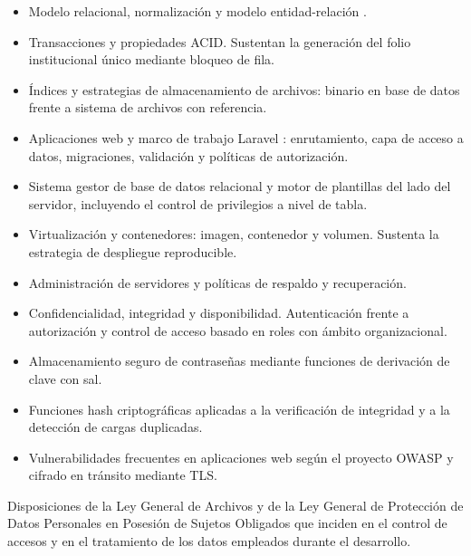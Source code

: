 \begin{description}[leftmargin=0pt,font=\bfseries,itemsep=0.6em,parsep=0pt]
  \item[Bases de datos y modelado.]\leavevmode
  \begin{itemize}[nosep,leftmargin=1.4em,topsep=1pt]
    \item Modelo relacional, normalización y modelo entidad-re\-la\-ción \cite{elmasri2016}.
    \item Transacciones y propiedades ACID. Sustentan la generación del folio institucional único mediante bloqueo de fila.
    \item Índices y estrategias de almacenamiento de archivos: binario en base de datos frente a sistema de archivos con referencia.
  \end{itemize}

  \item[Tecnologías de desarrollo e infraestructura.]\leavevmode
  \begin{itemize}[nosep,leftmargin=1.4em,topsep=1pt]
    \item Aplicaciones web y marco de trabajo Laravel \cite{laraveldocs}: enrutamiento, capa de acceso a datos, migraciones, validación y políticas de autorización.
    \item Sistema gestor de base de datos relacional y motor de plantillas del lado del servidor, incluyendo el control de privilegios a nivel de tabla.
    \item Virtualización y contenedores: imagen, contenedor y volumen. Sustenta la estrategia de despliegue reproducible.
    \item Administración de servidores y políticas de respaldo y recuperación.
  \end{itemize}

  \item[Seguridad de la información.]\leavevmode
  \begin{itemize}[nosep,leftmargin=1.4em,topsep=1pt]
    \item Confidencialidad, integridad y disponibilidad. Autenticación frente a autorización y control de acceso basado en roles con ámbito organizacional.
    \item Almacenamiento seguro de contraseñas mediante funciones de derivación de clave con sal.
    \item Funciones hash criptográficas aplicadas a la verificación de integridad y a la detección de cargas duplicadas.
    \item Vulnerabilidades frecuentes en aplicaciones web según el proyecto OWASP \cite{owasp2021} y cifrado en tránsito mediante TLS.
  \end{itemize}

  \item[Marco normativo aplicable.] Disposiciones de la Ley General de Archivos \cite{lga2018} y de la Ley General de Protección de Datos Personales en Posesión de Sujetos Obligados \cite{lgpdppso2017} que inciden en el control de accesos y en el tratamiento de los datos empleados durante el desarrollo.
\end{description}

